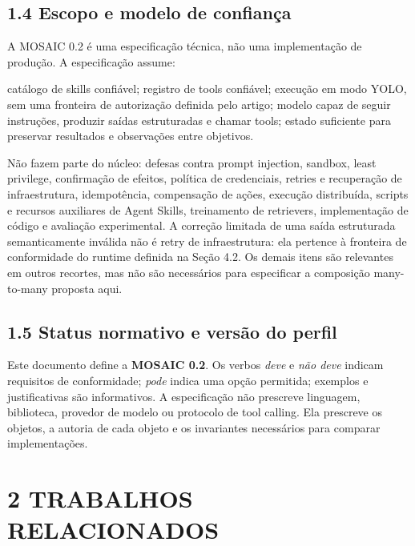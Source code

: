 \documentclass[12pt,a4paper]{article}
\begin{document}


\subsection*{1.4 Escopo e modelo de confiança}

A MOSAIC 0.2 é uma especificação técnica, não uma implementação de produção. A especificação assume:


\noindent \textbullet{} catálogo de skills confiável; \textbullet{} registro de tools confiável; \textbullet{} execução em modo YOLO, sem uma fronteira de autorização definida pelo artigo; \textbullet{} modelo capaz de seguir instruções, produzir saídas estruturadas e chamar tools; \textbullet{} estado suficiente para preservar resultados e observações entre objetivos.\par

Não fazem parte do núcleo: defesas contra prompt injection, sandbox, least privilege, confirmação de efeitos, política de credenciais, retries e recuperação de infraestrutura, idempotência, compensação de ações, execução distribuída, scripts e recursos auxiliares de Agent Skills, treinamento de retrievers, implementação de código e avaliação experimental. A correção limitada de uma saída estruturada semanticamente inválida não é retry de infraestrutura: ela pertence à fronteira de conformidade do runtime definida na Seção 4.2. Os demais itens são relevantes em outros recortes, mas não são necessários para especificar a composição many-to-many proposta aqui.


\subsection*{1.5 Status normativo e versão do perfil}

Este documento define a \textbf{MOSAIC 0.2}. Os verbos \textit{deve} e \textit{não deve} indicam requisitos de conformidade; \textit{pode} indica uma opção permitida; exemplos e justificativas são informativos. A especificação não prescreve linguagem, biblioteca, provedor de modelo ou protocolo de tool calling. Ela prescreve os objetos, a autoria de cada objeto e os invariantes necessários para comparar implementações.



\section*{2 TRABALHOS RELACIONADOS}
\end{document}
